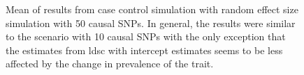 \begin{figure}
{				
				\label{fig:ldscInCC50RandMean}
			}
			\caption[Mean of Case Control Simulation Results (50 Causal)]
			{Mean of results from case control simulation with random effect size simulation with 50 causal \glspl{SNP}.
				In general, the results were similar to the scenario with 10 causal \glspl{SNP} with the only exception that the estimates from \gls{ldsc} with intercept estimates seems to be less affected by the change in prevalence of the trait.
				} 
			\label{fig:CC50RandMean}
		\end{figure}
		
